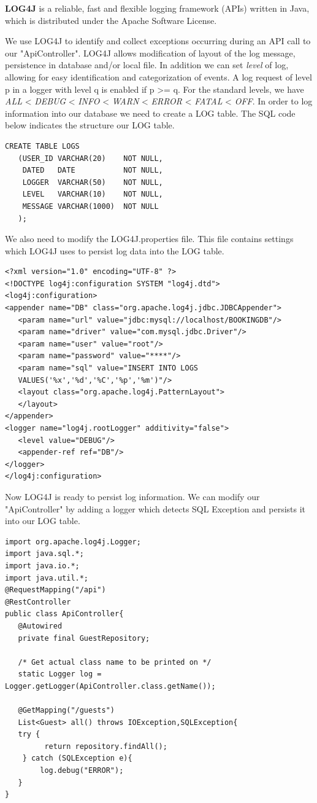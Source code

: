 \textbf{LOG4J} is a reliable, fast and flexible logging framework (APIs) written in Java, which is distributed under the Apache Software License.

We use LOG4J to identify and collect exceptions occurring during an API call to our "ApiController". LOG4J allows  modification of layout of the log message, persistence in database and/or local file. In addition we can set \textit{level} of log, allowing for easy identification and categorization of events. A log request of level p in a logger with level q is enabled if p >= q. For the standard levels, we have \textit{ALL} < \textit{DEBUG} < \textit{INFO} < \textit{WARN} < \textit{ERROR} < \textit{FATAL} < \textit{OFF}. 
In order to log information into our database we need to create a LOG table. The SQL code below indicates the structure our LOG table.

\begin{verbatim}
CREATE TABLE LOGS
   (USER_ID VARCHAR(20)    NOT NULL,
    DATED   DATE           NOT NULL,
    LOGGER  VARCHAR(50)    NOT NULL,
    LEVEL   VARCHAR(10)    NOT NULL,
    MESSAGE VARCHAR(1000)  NOT NULL
   );    
\end{verbatim}

We also need to modify the LOG4J.properties file. This file contains settings which LOG4J uses to persist log data into the LOG table. 

\begin{verbatim}
<?xml version="1.0" encoding="UTF-8" ?>
<!DOCTYPE log4j:configuration SYSTEM "log4j.dtd">
<log4j:configuration>
<appender name="DB" class="org.apache.log4j.jdbc.JDBCAppender">
   <param name="url" value="jdbc:mysql://localhost/BOOKINGDB"/>
   <param name="driver" value="com.mysql.jdbc.Driver"/>
   <param name="user" value="root"/>
   <param name="password" value="****"/>
   <param name="sql" value="INSERT INTO LOGS 
   VALUES('%x','%d','%C','%p','%m')"/>
   <layout class="org.apache.log4j.PatternLayout">
   </layout>
</appender>
<logger name="log4j.rootLogger" additivity="false">
   <level value="DEBUG"/>
   <appender-ref ref="DB"/>
</logger>
</log4j:configuration>
\end{verbatim}

Now LOG4J is ready to persist log information. We can modify our "ApiController" by adding a logger which detects SQL Exception and persists it into our LOG table.

\begin{verbatim}
import org.apache.log4j.Logger;
import java.sql.*;
import java.io.*;
import java.util.*;
@RequestMapping("/api")
@RestController
public class ApiController{
   @Autowired
   private final GuestRepository;
   
   /* Get actual class name to be printed on */
   static Logger log = Logger.getLogger(ApiController.class.getName());
   
   @GetMapping("/guests")
   List<Guest> all() throws IOException,SQLException{
   try {
         return repository.findAll();
    } catch (SQLException e){
        log.debug("ERROR");
   }
}
\end{verbatim}


